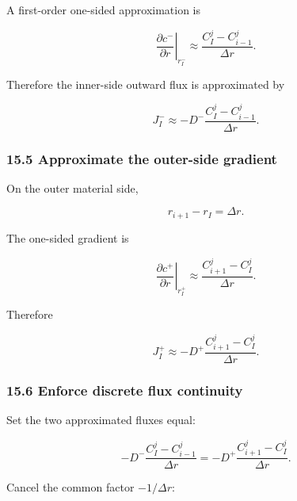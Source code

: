 \documentclass[11pt,a4paper]{article}
\begin{document}
A first-order one-sided approximation is

\begin{equation}
\left.
\frac{\partial c^-}{\partial r}
\right|_{r_I^-}
\approx
\frac{
C_I^j-C_{i-1}^j
}{
\Delta r
}.
\tag{TRISO-DIS-313}
\label{eq:triso-dis-313}
\end{equation}

Therefore the inner-side outward flux is approximated by

\begin{equation}
J_I^-
\approx
-D^-
\frac{
C_I^j-C_{i-1}^j
}{
\Delta r
}.
\tag{TRISO-DIS-314}
\label{eq:triso-dis-314}
\end{equation}

\subsubsection*{15.5 Approximate the outer-side gradient}

On the outer material side,

\begin{equation}
r_{i+1}-r_I=\Delta r.
\tag{TRISO-DIS-315}
\label{eq:triso-dis-315}
\end{equation}

The one-sided gradient is

\begin{equation}
\left.
\frac{\partial c^+}{\partial r}
\right|_{r_I^+}
\approx
\frac{
C_{i+1}^j-C_I^j
}{
\Delta r
}.
\tag{TRISO-DIS-316}
\label{eq:triso-dis-316}
\end{equation}

Therefore

\begin{equation}
J_I^+
\approx
-D^+
\frac{
C_{i+1}^j-C_I^j
}{
\Delta r
}.
\tag{TRISO-DIS-317}
\label{eq:triso-dis-317}
\end{equation}

\subsubsection*{15.6 Enforce discrete flux continuity}

Set the two approximated fluxes equal:

\begin{equation}
-D^-
\frac{
C_I^j-C_{i-1}^j
}{
\Delta r
}
=
-D^+
\frac{
C_{i+1}^j-C_I^j
}{
\Delta r
}.
\tag{TRISO-DIS-318}
\label{eq:triso-dis-318}
\end{equation}

Cancel the common factor $-1/\Delta r$:
\end{document}
